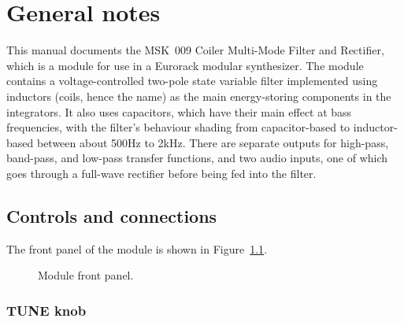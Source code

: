 
%
%
%
%
%
%

\chapter{General notes}

This manual documents the MSK~009 Coiler Multi-Mode Filter and Rectifier,
which is a module for use in a Eurorack modular synthesizer.  The module
contains a voltage-controlled two-pole state variable filter
implemented using inductors (coils, hence the name) as the main
energy-storing components in the integrators.  It also uses capacitors,
which have their main effect at bass frequencies, with the filter's
behaviour shading from capacitor-based to inductor-based between about 500Hz
to 2kHz.  There are separate outputs for high-pass, band-pass, and low-pass
transfer functions, and two audio inputs, one of which goes through a
full-wave rectifier before being fed into the filter.

\section{Controls and connections}

The front panel of the module is shown in Figure~\ref{fig:panel-mockup}.

\begin{figure}
{\centering\setlength{\fboxsep}{0pt}\setlength{\fboxrule}{0.6pt}%
\par}
\caption{Module front panel.}\label{fig:panel-mockup}
\end{figure}

\subsection{TUNE knob}


